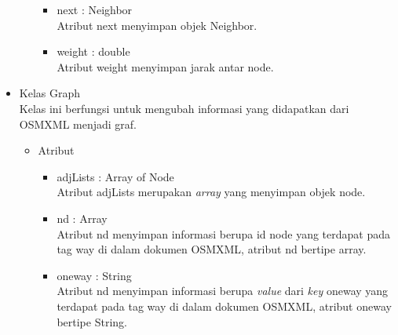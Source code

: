 \begin{itemize}
\begin{itemize}
\begin{itemize}
      \item next : Neighbor\\
      Atribut next menyimpan objek Neighbor.
      
      \item weight : double\\
      Atribut weight menyimpan jarak antar node.
    \end{itemize}
  \end{itemize}
  
  \item Kelas Graph\\
  Kelas ini berfungsi untuk mengubah informasi yang didapatkan dari OSMXML
  menjadi graf.
  \begin{itemize}
    \item Atribut
    \begin{itemize}
      \item adjLists : Array of Node\\
      Atribut adjLists merupakan \textit{array} yang menyimpan objek node.
      
      \item nd : Array\\
      Atribut nd menyimpan informasi berupa id node yang terdapat pada tag way
      di dalam dokumen OSMXML, atribut nd bertipe array.
      
      \item oneway : String\\
      Atribut nd menyimpan informasi berupa \textit{value} dari \textit{key}
      oneway yang terdapat pada tag way di dalam dokumen OSMXML, atribut oneway bertipe String.


\end{itemize}
\end{itemize}
\end{itemize}
